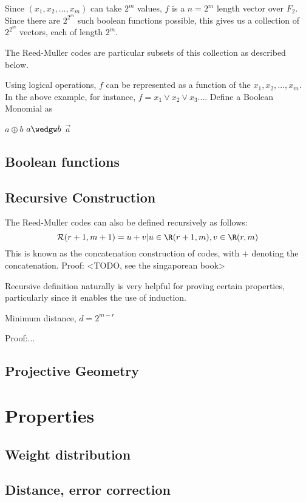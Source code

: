 \documentclass[]{article}
\begin{document}
Since $(x_1,x_2,\ldots,x_m)$ can take $2^m$ values, $f$ is a $n=2^m$ length vector over $F_2$. Since there are $2^2^m$ such boolean functions possible, this gives us a collection of  $2^2^m$ vectors, each of length $2^m$.
 
The Reed-Muller codes are particular subsets of this collection as described below.

Using logical operations, $f$ can be represented as a function of the $x_1, x_2, \ldots , x_m$. In the above example, for instance, $f = x_1 \vee x_2 \vee x_3 ... $. 
Define a Boolean Monomial as 

$a \oplus b$
$a \wedgw b$
$\vec{a}$



\subsection {Boolean functions}

\subsection {Recursive Construction}
The Reed-Muller codes can also be defined recursively as follows:
\begin{equation}
\mathcal{R}(r+1,m+1) = {u+v| u \in \R(r+1,m), v \in \R(r,m)}
\end{equation}
This is known as the concatenation construction of codes, with $+$ denoting the concatenation.
Proof: <TODO, see the singaporean book>

Recursive definition naturally is very helpful for proving certain properties, particularly since it enables the use of induction.
\begin{theorem}
Minimum distance, $d=2^{m-r}$
\end{theorem}
Proof:...
\subsection {Projective Geometry}
 
\section {Properties}
\subsection {Weight distribution}
\subsection {Distance, error correction}
\end{document}

